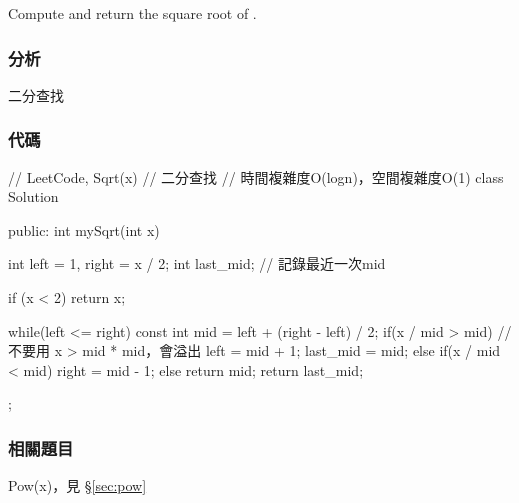 Compute and return the square root of .


\subsubsection{分析}
二分查找


\subsubsection{代碼}
\begin{Code}
// LeetCode, Sqrt(x)
// 二分查找
// 時間複雜度O(logn)，空間複雜度O(1)
class Solution {
public:
    int mySqrt(int x) {
        int left = 1, right = x / 2;
        int last_mid;  // 記錄最近一次mid

        if (x < 2) return x;

        while(left <= right) {
            const int mid = left + (right - left) / 2;
            if(x / mid > mid) { // 不要用 x > mid * mid，會溢出
                left = mid + 1;
                last_mid = mid;
            } else if(x / mid < mid) {
                right = mid - 1;
            } else {
                return mid;
            }
        }
        return last_mid;
    }
};
\end{Code}


\subsubsection{相關題目}
\begindot
\item Pow(x)，見 \S \ref{sec:pow}
\myenddot
